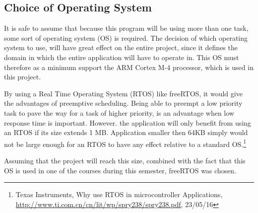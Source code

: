 \subsection{Choice of Operating System}
\label{sec:ChoiceofOperatingSystem}

It is safe to assume that because this program will be using more than one task, some sort of operating system (OS) is required. The decision of which operating system to use, will have great effect on the entire project, since it defines the domain in which the entire application will have to operate in. This OS must therefore as a minimum support the ARM Cortex M-4 processor, which is used in this project. 

By using a Real Time Operating System (RTOS) like freeRTOS, it would give the advantages of preemptive scheduling. Being able to preempt a low priority task to pave the way for a task of higher priority, is an advantage when low response time is important. However. the application will only benefit from using an RTOS if its size extends 1 MB. Application smaller then 64KB simply would not be large enough for an RTOS to have any effect relative to a standard OS.\footnote{Texas Instruments, Why use RTOS in microcontroller Applications, \url{http://www.ti.com.cn/cn/lit/wp/spry238/spry238.pdf}, 23/05/16}

Assuming that the project will reach this size, combined with the fact that this OS is used in one of the courses during this semester, freeRTOS was chosen.